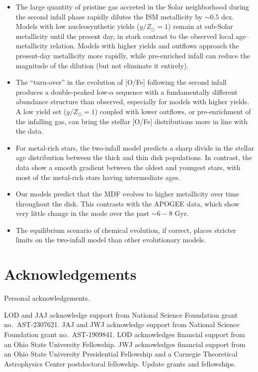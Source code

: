 \documentclass[twocolumn,twocolappendix,linenumbers]{aastex631}
\newcommand{\todo}[1]{{\color{red}#1}}
\newcommand{\yZ}[1]{$y/Z_\odot=#1$}
\begin{document}
\begin{itemize}
    \item The large quantity of pristine gas accreted in the Solar neighborhood during the second infall phase rapidly dilutes the ISM metallicity by $\sim0.5$ dex. Models with low nucleosynthetic yields (\yZ{1}) remain at sub-Solar metallicity until the present day, in stark contrast to the observed local age--metallicity relation. Models with higher yields and outflows approach the present-day metallicity more rapidly, while pre-enriched infall can reduce the magnitude of the dilution (but not eliminate it entirely). %
    \item The ``turn-over'' in the evolution of [O/Fe] following the second infall produces a double-peaked low-$\alpha$ sequence with a fundamentally different abundance structure than observed, especially for models with higher yields. A low yield set (\yZ{1}) coupled with lower outflows, or pre-enrichment of the infalling gas, can bring the stellar [O/Fe] distributions more in line with the data.
    \item For metal-rich stars, the two-infall model predicts a sharp divide in the stellar age distribution between the thick and thin disk populations. In contrast, the data show a smooth gradient between the oldest and youngest stars, with most of the metal-rich stars having intermediate ages.
    \item Our models predict that the MDF evolves to higher metallicity over time throughout the disk. This contrasts with the APOGEE data, which show very little change in the mode over the past $\sim6-8$ Gyr.
    \item The equilibrium scenario of chemical evolution, if correct, places stricter limits on the two-infall model than other evolutionary models.
\end{itemize}

\section*{Acknowledgements}

\todo{Personal acknowledgements.}

LOD and JAJ acknowledge support from National Science Foundation grant no.\ AST-2307621. JAJ and JWJ acknowledge support from National Science Foundation grant no.\ AST-1909841.
LOD acknowledges financial support from an Ohio State University Fellowship.
JWJ acknowledges financial support from an Ohio State University Presidential Fellowship and a Carnegie Theoretical Astrophysics Center postdoctoral fellowship. \todo{Update grants and fellowships.}
\end{document}
